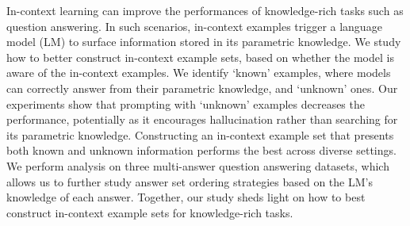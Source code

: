 In-context learning can improve the performances of knowledge-rich tasks such as question answering. In such scenarios, in-context examples trigger a language model (LM) to surface information stored in its parametric knowledge. We study how to better construct in-context example sets, based on whether the model is aware of the in-context examples. We identify ‘known’ examples, where models can correctly answer from their parametric knowledge, and ‘unknown’ ones. Our experiments show that prompting with ‘unknown’ examples decreases the performance, potentially as it encourages hallucination rather than searching for its parametric knowledge. Constructing an in-context example set that presents both known and unknown information performs the best across diverse settings. We perform analysis on three multi-answer question answering datasets, which allows us to further study answer set ordering strategies based on the LM's knowledge of each answer. Together, our study sheds light on how to best construct in-context example sets for knowledge-rich tasks.
